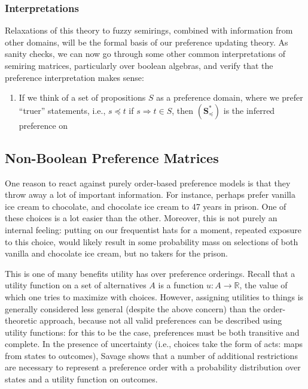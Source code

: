 \documentclass{article}
\theoremstyle{plain}
\theoremstyle{definition}
\theoremstyle{remark}
\newcommand\leqc{\preccurlyeq}
\newcommand\mat[1]{\mathbf #1}
\begin{document}
	\subsubsection{Interpretations}
	Relaxations of this theory to fuzzy semirings, combined with information from other domains, will be the formal basis of our preference updating theory. As sanity checks, we can now go through some other common interpretations of semiring matrices, particularly over boolean algebras, and verify that the preference interpretation makes sense:
	
	\begin{enumerate}[nosep]
		\item If we think of a set of propositions $S$ as a preference domain, where we prefer ``truer'' statements, i.e., $s \leqc t$ if $s \Rightarrow t \in S$, then $(\mat S_\leqc^*)$ is the inferred preference on 
	\end{enumerate}

	\subsection{Non-Boolean Preference Matrices}
	One reason to react against purely order-based preference models is that they throw away a lot of important information. For instance, perhaps prefer vanilla ice cream to chocolate, and chocolate ice cream to 47 years in prison. One of these choices is a lot easier than the other. Moreover, this is not purely an internal feeling: putting on our frequentist hats for a moment, repeated exposure to this choice, would likely result in some probability mass on selections of both vanilla and chocolate ice cream, but no takers for the prison.
	
	This is one of many benefits utility has over preference orderings. Recall that a utility function on a set of alternatives $A$ is a function $u : A \to \mathbb R$, the value of which one tries to maximize with choices. 
	However, assigning utilities to things is generally considered less general (despite the above concern) than the order-theoretic approach, because not all valid preferences can be described using utility functions: for this to be the case, preferences must be both transitive and complete. In the presence of uncertainty (i.e., choices take the form of acts: maps from states to outcomes), Savage \cite{savage1972foundations} shows that a number of additional restrictions are necessary to represent a preference order with a probability distribution over states and a utility function on outcomes. 
	
\end{document}
